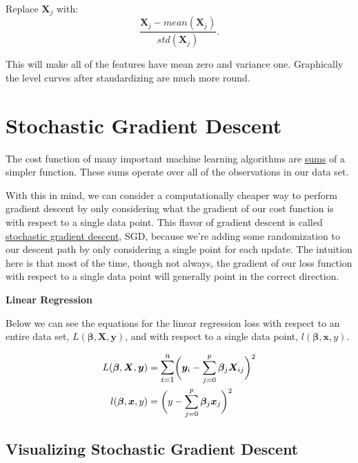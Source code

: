 \documentclass[a4paper, 12pt]{article}
\begin{document}
Replace $\bm{X}_j$ with:
$$\frac{\bm{X}_j - mean(\bm{X}_j)}{std(\bm{X}_j)}.$$ 

This will make all of the features have mean zero and variance one. Graphically the level curves after standardizing are much more round.

\section*{Stochastic Gradient Descent}

The cost function of many important machine learning algorithms are \underline{sums} of a simpler function. These sums operate over all of the observations in our data set.

\vspace{1pc}

With this in mind, we can consider a computationally cheaper way to perform gradient descent by only considering what the gradient of our cost function is with respect to a single data point. This flavor of gradient descent is called \underline{stochastic gradient descent}, SGD, because we're adding some randomization to our descent path by only considering a single point for each update. The intuition here is that most of the time, though not always, the gradient of our loss function with respect to a single data point will generally point in the correct direction.

\vspace{1pc}

\textbf{Linear Regression}

\vspace{1pc}

Below we can see the equations for the linear regression loss with respect to an entire data set, $L(\bm{\beta}, \bm{X}, \bm{y})$, and with respect to a single data point, $l(\bm{\beta}, \bm{x}, y)$.

  \begin{align*}
    L(\bm{\beta}, \bm{X}, \bm{y}) &= \mathlarger{\sum_{i=1}^n}
                     \bigg(\bm{y}_i - \sum_{j=0}^p \bm{\beta}_j \bm{X}_{ij} \bigg)^2 \\
    l(\bm{\beta}, \bm{x}, y) &= \bigg(y - \sum_{j=0}^p \bm{\beta}_j \bm{x}_j \bigg)^2
  \end{align*}

\subsection*{Visualizing Stochastic Gradient Descent}
\end{document}
